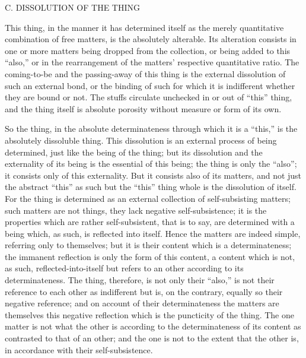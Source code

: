 C. DISSOLUTION OF THE THING

This thing, in the manner it has determined itself
as the merely quantitative combination of free matters,
is the absolutely alterable.
Its alteration consists in one or more matters
being dropped from the collection,
or being added to this “also,”
or in the rearrangement of the matters'
respective quantitative ratio.
The coming-to-be and the passing-away of this thing is
the external dissolution of such an external bond,
or the binding of such for which it is indifferent
whether they are bound or not.
The stuffs circulate unchecked in or out of “this” thing,
and the thing itself is absolute porosity
without measure or form of its own.

So the thing, in the absolute determinateness
through which it is a “this,”
is the absolutely dissoluble thing.
This dissolution is an external process of being determined,
just like the being of the thing;
but its dissolution and the externality of its being
is the essential of this being;
the thing is only the “also”;
it consists only of this externality.
But it consists also of its matters,
and not just the abstract “this” as such
but the “this” thing whole is the dissolution of itself.
For the thing is determined as an external collection
of self-subsisting matters;
such matters are not things,
they lack negative self-subsistence;
it is the properties which are rather self-subsistent,
that is to say, are determined with a being
which, as such, is reflected into itself.
Hence the matters are indeed simple, referring only to themselves;
but it is their content which is a determinateness;
the immanent reflection is only the form of this content,
a content which is not, as such, reflected-into-itself
but refers to an other according to its determinateness.
The thing, therefore, is not only their “also,”
is not their reference to each other as indifferent
but is, on the contrary, equally so their negative reference;
and on account of their determinateness
the matters are themselves this negative reflection
which is the puncticity of the thing.
The one matter is not what the other is
according to the determinateness of its content
as contrasted to that of an other;
and the one is not to the extent that the other is,
in accordance with their self-subsistence.

